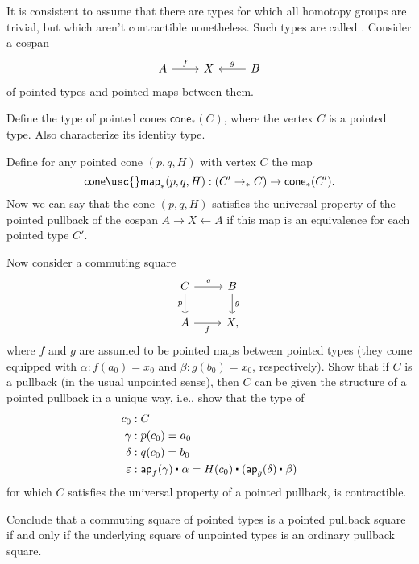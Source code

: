 \begin{exercises}
\begin{subexenum}
\end{subexenum}
It is consistent to assume that there are types for which all homotopy groups are trivial, but which aren't contractible nonetheless. Such types are called .
\exercise
  Consider a cospan
  \begin{equation*}
    \begin{tikzcd}
      A \arrow[r,"f"] & X & B \arrow[l,swap,"g"]
    \end{tikzcd}
  \end{equation*}
  of pointed types and pointed maps between them.
  \begin{subexenum}
  \item Define the type of pointed cones $\mathsf{cone}_\ast(C)$, where the vertex $C$ is a pointed type. Also characterize its identity type.
  \item Define for any pointed cone $(p,q,H)$ with vertex $C$ the map
    \begin{equation*}
      \mathsf{cone\usc{}map}_\ast(p,q,H) : (C' \to_\ast C) \to \mathsf{cone}_\ast(C').
    \end{equation*}
    Now we can say that the cone $(p,q,H)$ satisfies the universal property of the pointed pullback of the cospan $A\rightarrow X \leftarrow A$ if this map is an equivalence for each pointed type $C'$.
  \item Now consider a commuting square
    \begin{equation*}
      \begin{tikzcd}
        C \arrow[r,"q"] \arrow[d,swap,"p"] & B \arrow[d,"g"] \\
        A \arrow[r,swap,"f"] & X,
      \end{tikzcd}
    \end{equation*}
    where $f$ and $g$ are assumed to be pointed maps between pointed types (they come equipped with $\alpha : f(a_0)=x_0$ and $\beta : g(b_0)=x_0$, respectively). Show that if $C$ is a pullback (in the usual unpointed sense), then $C$ can be given the structure of a pointed pullback in a unique way, i.e., show that the type of
    \begin{align*}
      c_0 & : C \\
      \gamma & : p(c_0)=a_0 \\
      \delta & : q(c_0)=b_0 \\
      \varepsilon & : \ct{\ap{f}{\gamma}}{\alpha}=\ct{H(c_0)}{(\ct{\ap{g}{\delta}}{\beta})}
    \end{align*}
    for which $C$ satisfies the universal property of a pointed pullback, is contractible.
  \item Conclude that a commuting square of pointed types is a pointed pullback square if and only if the underlying square of unpointed types is an ordinary pullback square.
  \end{subexenum}
\end{exercises}
